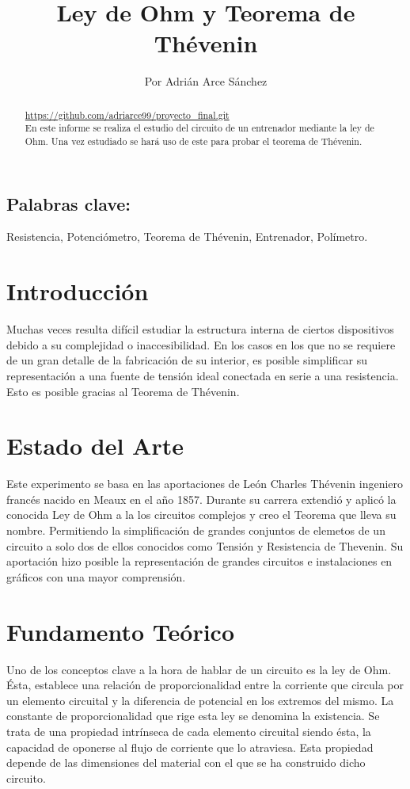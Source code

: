 \documentclass[a4paper,11pt]{article}
\begin{document}
\title{\textbf{Ley de Ohm y Teorema de Thévenin}}
\author{ Por Adrián Arce Sánchez}
\maketitle


\begin{abstract}
\url{https://github.com/adriarce99/proyecto_final.git}\\
En este informe se realiza el estudio del circuito de un entrenador mediante la ley de Ohm. Una vez estudiado se hará uso de este para probar el teorema de Thévenin.
\end{abstract}

\subsection*{Palabras clave:}
Resistencia, Potenciómetro, Teorema de Thévenin, Entrenador, Polímetro.

\section{Introducción}
Muchas veces resulta difícil estudiar la estructura interna de ciertos dispositivos debido a su complejidad o inaccesibilidad. En los casos en los que no se requiere de un gran detalle de la fabricación de su interior, es posible simplificar su representación a una fuente de tensión ideal conectada en serie a una resistencia. Esto es posible gracias al Teorema de Thévenin.

\section{Estado del Arte}
Este experimento se basa en las aportaciones de León Charles Thévenin ingeniero francés nacido en Meaux en el año 1857. Durante su carrera extendió y aplicó la conocida Ley de Ohm a la los circuitos complejos y creo el Teorema que lleva su nombre. Permitiendo la simplificación de grandes conjuntos de elemetos de un circuito a solo dos de ellos conocidos como Tensión y Resistencia de Thevenin. Su aportación hizo posible la representación de grandes circuitos e instalaciones en gráficos con una mayor comprensión.

\newpage
\section{Fundamento Teórico}
Uno de los conceptos clave a la hora de hablar de un circuito es la ley de Ohm. Ésta, establece una relación de proporcionalidad entre la corriente que circula por un elemento circuital y la diferencia de potencial en los extremos del mismo. La constante de proporcionalidad que rige esta ley se denomina la existencia. Se trata de una propiedad intrínseca de cada elemento circuital siendo ésta, la capacidad de oponerse al flujo de corriente que lo atraviesa. Esta propiedad depende de las dimensiones del material con el que se ha construido dicho circuito.
\end{document}
